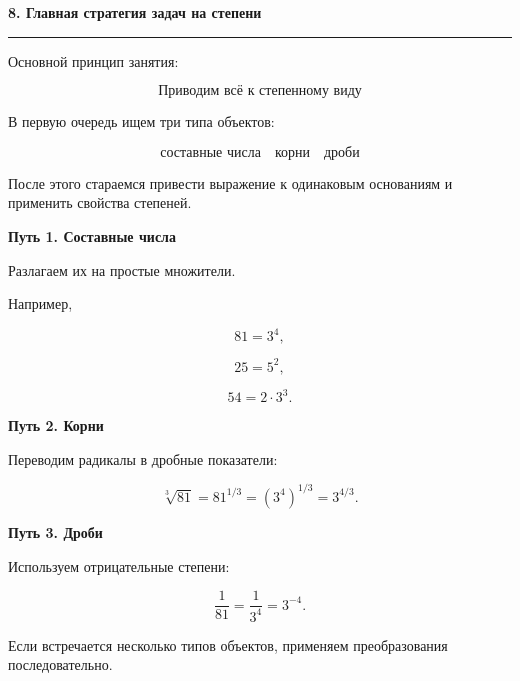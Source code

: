 \documentclass[a4paper,12pt]{article}
\newcommand{\MainSection}[1]{%
  \vspace{0.7em}
  {\Large\bfseries\color{darkaccent}#1\par}
  \vspace{0.25em}
  {\color{accent}\rule{\linewidth}{0.6pt}}
  \vspace{0.5em}
}
\newcommand{\SubSection}[1]{%
  \vspace{0.5em}
  {\large\bfseries\color{accent}#1\par}
  \vspace{0.2em}
}
\begin{document}

\MainSection{8. Главная стратегия задач на степени}

Основной принцип занятия:

\[
\boxed{
\text{Приводим всё к степенному виду}
}
\]

В первую очередь ищем три типа объектов:

\[
\boxed{
\text{составные числа}
\quad
\text{корни}
\quad
\text{дроби}
}
\]

После этого стараемся привести выражение к одинаковым основаниям
и применить свойства степеней.

\SubSection{Путь 1. Составные числа}

Разлагаем их на простые множители.

Например,

\[
81=3^4,
\]

\[
25=5^2,
\]

\[
54=2\cdot3^3.
\]

\SubSection{Путь 2. Корни}

Переводим радикалы в дробные показатели:

\[
\sqrt[3]{81}
=
81^{1/3}
=
(3^4)^{1/3}
=
3^{4/3}.
\]

\SubSection{Путь 3. Дроби}

Используем отрицательные степени:

\[
\frac1{81}
=
\frac1{3^4}
=
3^{-4}.
\]

Если встречается несколько типов объектов, применяем преобразования
последовательно.


\clearpage
\end{document}
